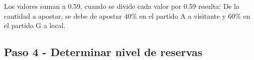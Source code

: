 \begin{table}[ht]
\centering
{}
\caption{Calculando la proporción del dinero que se debe invertir en estas apuestas}
\label{proporcion}
\end{table}


Los valores suman a 0.59, cuando se divide cada valor por 0.59 resulta: De la cantidad a apostar, se debe de apostar $40 \%$ en el partido A a visitante y $60 \%$ en el partido G a local.


\subsection{Paso 4 - Determinar nivel de reservas}
\label{sec:paso-4}

